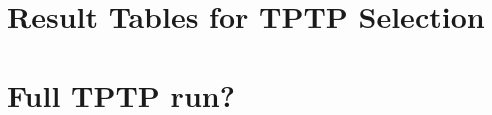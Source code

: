 
\appendix

\chapter{Result Tables for TPTP Selection}
\label{app:app1}

\chapter{Full TPTP run?}
\label{app:app2}

